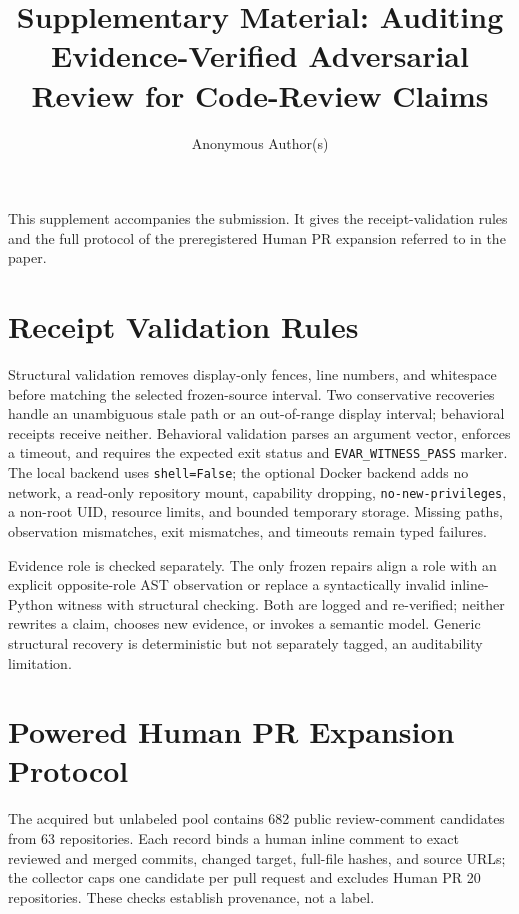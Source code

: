 \documentclass[acmsmall,screen,review,anonymous]{acmart}
\title{Supplementary Material: Auditing Evidence-Verified Adversarial Review for Code-Review Claims}
\author{Anonymous Author(s)}
\begin{document}
\maketitle

This supplement accompanies the submission. It gives the receipt-validation rules and the full protocol of the preregistered Human PR expansion referred to in the paper.

\appendix

\section{Receipt Validation Rules}

Structural validation removes display-only fences, line numbers, and whitespace before matching the selected frozen-source interval. Two conservative recoveries handle an unambiguous stale path or an out-of-range display interval; behavioral receipts receive neither. Behavioral validation parses an argument vector, enforces a timeout, and requires the expected exit status and \texttt{EVAR\_WITNESS\_PASS} marker. The local backend uses \texttt{shell=False}; the optional Docker backend adds no network, a read-only repository mount, capability dropping, \texttt{no-new-privileges}, a non-root UID, resource limits, and bounded temporary storage. Missing paths, observation mismatches, exit mismatches, and timeouts remain typed failures.

Evidence role is checked separately. The only frozen repairs align a role with an explicit opposite-role AST observation or replace a syntactically invalid inline-Python witness with structural checking. Both are logged and re-verified; neither rewrites a claim, chooses new evidence, or invokes a semantic model. Generic structural recovery is deterministic but not separately tagged, an auditability limitation.

\section{Powered Human PR Expansion Protocol}

The acquired but unlabeled pool contains 682 public review-comment candidates from 63 repositories. Each record binds a human inline comment to exact reviewed and merged commits, changed target, full-file hashes, and source URLs; the collector caps one candidate per pull request and excludes Human PR 20 repositories. These checks establish provenance, not a label.
\end{document}
